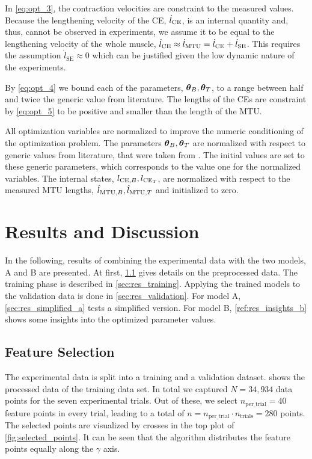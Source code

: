 In \cref{eq:opt_3}, the contraction velocities are constraint to the measured values. Because the lengthening velocity of the CE, $\dot{l}_{\text{CE}}$, is an internal quantity and, thus, cannot be observed in experiments, we assume it to be equal to the lengthening velocity of the whole muscle, $\dot{l}_{\text{CE}} \approx \dot{l}_{\text{MTU}} = \dot{l}_\text{CE} + \dot{l}_\text{SE}$. This requires the assumption $\dot{l}_{\text{SE}} \approx 0$ which can be justified given the low dynamic nature of the experiments.

By \cref{eq:opt_4} we bound each of the parameters, $\boldsymbol{\theta}_B,\boldsymbol{\theta}_T$, to a range between half and twice the generic value from literature.
The lengths of the CEs are constraint by \cref{eq:opt_5} to be positive and smaller than the length of the MTU.

All optimization variables are normalized to improve the numeric conditioning of the optimization problem. 
The parameters $\boldsymbol{\theta}_B,\boldsymbol{\theta}_T$ are normalized with respect to generic values from literature, that were taken from \cite{Gunther2007, Morl2012, Hilltype2014}. The initial values are set to these generic parameters, which corresponds to the value one for the normalized variables.
The internal states, $l_{\text{CE},B},l_{\text{CE}_T}$, are normalized with respect to the measured MTU lengths, $\hat{l}_{\text{MTU},B}, \hat{l}_{\text{MTU},T}$ and initialized to zero.

\section{Results and Discussion}\label{sec:evaluation}

In the following, results of combining the experimental data with the two models, A and B are presented.
At first, \cref{sec:res_feature_selection} gives details on the preprocessed data. The training phase is described in \cref{sec:res_training}. Applying the trained models to the validation data is done in \cref{sec:res_validation}. For model A, \cref{sec:res_simplified_a} tests a simplified version. For model B, \cref{ref:res_insights_b} shows some insights into the optimized parameter values.

\subsection{Feature Selection}\label{sec:res_feature_selection}
The experimental data is split into a training and a validation dataset.  shows the processed data of the training data set. In total we captured $N=34,934$ data points for the seven experimental trials. Out of these, we select $n_\text{per\_trial}=40$ feature points in every trial, leading to a total of $n=n_\text{per\_trial}\cdot n_\text{trials}=280$ points. The selected points are visualized by crosses in the top plot of \cref{fig:selected_points}. It can be seen that the algorithm distributes the feature points equally along the $\gamma$ axis.

